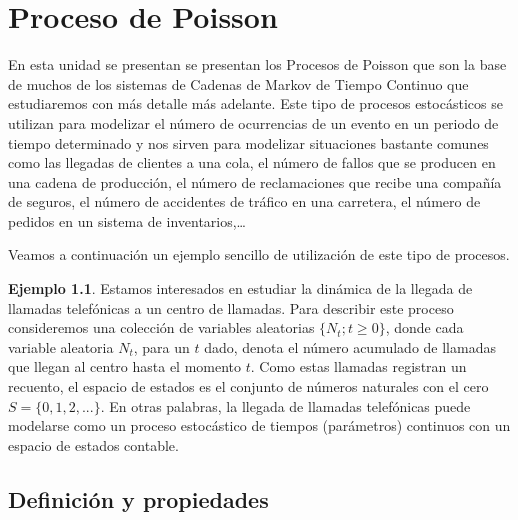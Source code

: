 \documentclass[
]{book}
\theoremstyle{definition}
\theoremstyle{definition}
\newtheorem{example}{Ejemplo}[chapter]
\theoremstyle{definition}
\theoremstyle{definition}
\theoremstyle{remark}
\begin{document}
\hypertarget{poissonprocess}{%
\chapter{Proceso de Poisson}\label{poissonprocess}}

En esta unidad se presentan se presentan los Procesos de Poisson que son la base de muchos de los sistemas de Cadenas de Markov de Tiempo Continuo que estudiaremos con más detalle más adelante. Este tipo de procesos estocásticos se utilizan para modelizar el número de ocurrencias de un evento en un periodo de tiempo determinado y nos sirven para modelizar situaciones bastante comunes como las llegadas de clientes a una cola, el número de fallos que se producen en una cadena de producción, el número de reclamaciones que recibe una compañía de seguros, el número de accidentes de tráfico en una carretera, el número de pedidos en un sistema de inventarios,\ldots{}

Veamos a continuación un ejemplo sencillo de utilización de este tipo de procesos.

\begin{example}
\protect\hypertarget{exm:pp001}{}\label{exm:pp001}Estamos interesados en estudiar la dinámica de la llegada de llamadas telefónicas a un centro de llamadas. Para describir este proceso consideremos una colección de variables aleatorias \(\{N_t; t ≥ 0\}\), donde cada variable aleatoria \(N_t\), para un \(t\) dado, denota el número acumulado de llamadas que llegan al centro hasta el momento \(t\). Como estas llamadas registran un recuento, el espacio de estados es el conjunto de números naturales con el cero \(S= \{0,1,2,...\}\). En otras palabras, la llegada de llamadas telefónicas puede modelarse como un proceso estocástico de tiempos (parámetros) continuos con un espacio de estados contable.
\end{example}

\hypertarget{definiciuxf3n-y-propiedades}{%
\section{Definición y propiedades}\label{definiciuxf3n-y-propiedades}}
\end{document}
